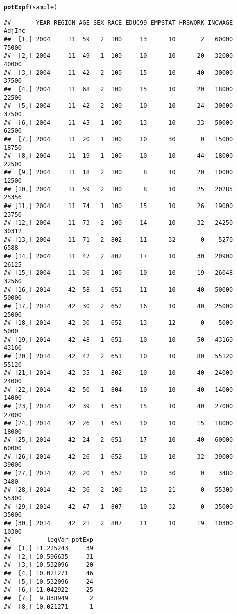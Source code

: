 \documentclass{article}\usepackage[]{graphicx}\usepackage[]{color}
\makeatletter
\newcommand{\hlstd}[1]{\textcolor[rgb]{0.345,0.345,0.345}{#1}}%
\newcommand{\hlkwd}[1]{\textcolor[rgb]{0.737,0.353,0.396}{\textbf{#1}}}%
\newenvironment{kframe}{%
 \def\at@end@of@kframe{}%
 \ifinner\ifhmode%
  \def\at@end@of@kframe{\end{minipage}}%
  \begin{minipage}{\columnwidth}%
 \fi\fi%
 \def\FrameCommand##1{\hskip\@totalleftmargin \hskip-\fboxsep
 \colorbox{shadecolor}{##1}\hskip-\fboxsep
     \hskip-\linewidth \hskip-\@totalleftmargin \hskip\columnwidth}%
 \MakeFramed {\advance\hsize-\width
   \@totalleftmargin\z@ \linewidth\hsize
   \@setminipage}}%
 {\par\unskip\endMakeFramed%
 \at@end@of@kframe}
\newenvironment{knitrout}{}{} %
\makeatother
\begin{document}
\begin{knitrout}
\begin{kframe}
\begin{alltt}
\hlkwd{potExpf}\hlstd{(sample)}
\end{alltt}
\begin{verbatim}
##       YEAR REGION AGE SEX RACE EDUC99 EMPSTAT HRSWORK INCWAGE AdjInc
##  [1,] 2004     11  59   2  100     13      10       2   60000  75000
##  [2,] 2004     11  49   1  100     10      10      20   32000  40000
##  [3,] 2004     11  42   2  100     15      10      40   30000  37500
##  [4,] 2004     11  68   2  100     15      10      20   18000  22500
##  [5,] 2004     11  42   2  100     10      10      24   30000  37500
##  [6,] 2004     11  45   1  100     13      10      33   50000  62500
##  [7,] 2004     11  20   1  100     10      30       0   15000  18750
##  [8,] 2004     11  19   1  100     10      10      44   18000  22500
##  [9,] 2004     11  18   2  100      8      10      20   10000  12500
## [10,] 2004     11  59   2  100      8      10      25   20285  25356
## [11,] 2004     11  74   1  100     15      10      26   19000  23750
## [12,] 2004     11  73   2  100     14      10      32   24250  30312
## [13,] 2004     11  71   2  802     11      32       0    5270   6588
## [14,] 2004     11  47   2  802     17      10      30   20900  26125
## [15,] 2004     11  36   1  100     10      10      19   26048  32560
## [16,] 2014     42  58   1  651     11      10      40   50000  50000
## [17,] 2014     42  30   2  652     16      10      40   25000  25000
## [18,] 2014     42  30   1  652     13      12       0    5000   5000
## [19,] 2014     42  48   1  651     10      10      50   43160  43160
## [20,] 2014     42  42   2  651     10      10      80   55120  55120
## [21,] 2014     42  35   1  802     10      10      40   24000  24000
## [22,] 2014     42  50   1  804     10      10      40   14000  14000
## [23,] 2014     42  39   1  651     15      10      40   27000  27000
## [24,] 2014     42  26   1  651     10      10      15   18000  18000
## [25,] 2014     42  24   2  651     17      10      40   60000  60000
## [26,] 2014     42  26   1  652     10      10      32   39000  39000
## [27,] 2014     42  20   1  652     10      30       0    3480   3480
## [28,] 2014     42  36   2  100     13      21       0   55300  55300
## [29,] 2014     42  47   1  807     10      32       0   35000  35000
## [30,] 2014     42  21   2  807     11      10      19   10300  10300
##          logVar potExp
##  [1,] 11.225243     39
##  [2,] 10.596635     31
##  [3,] 10.532096     20
##  [4,] 10.021271     46
##  [5,] 10.532096     24
##  [6,] 11.042922     25
##  [7,]  9.838949      2
##  [8,] 10.021271      1

\end{verbatim}
\end{kframe}
\end{knitrout}
\end{document}

